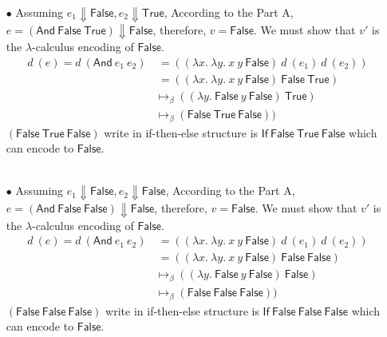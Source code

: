 \documentclass[a4paper,answers]{exam}
\begin{document}
\begin{itemize}
\begin{solution}
\begin{itemize}[leftmargin=*]
\begin{itemize}[leftmargin=*]
            
                \item[$\bullet$] Assuming $e_1 \Downarrow \mathsf{False}, e_2 \Downarrow \mathsf{True}$, According to the Part A, $e = (\mathsf{And\ False\ True}) \Downarrow \mathsf{False}$, therefore, $v = \mathsf{False}$.  We must show that $v'$ is the $\lambda$-calculus encoding of $\mathsf{False}$.
                \begin{align*}
                    d\ (e) = d\ (\mathsf{And}\ e_1\ e_2) &\ = ((\lambda x.\ \lambda y.\ x\ y\ \mathsf{False})\ d\ (e_1)\ d\ (e_2))\\
                    &\ = ((\lambda x.\ \lambda y.\ x\ y\ \mathsf{False})\ \mathsf{False\ True})\\
                    & \mapsto_{\beta} ((\lambda y.\ \mathsf{False}\ y\ \mathsf{False})\ \mathsf{True})\\
                    & \mapsto_{\beta} (\mathsf{False\ True\ False}))
                \end{align*}
                $(\mathsf{False\ True\ False})$ write in if-then-else structure is $\mathsf{If\ False\ True\ False}$ which can encode to $\mathsf{False}$.\\\\
                
                
                \item[$\bullet$] Assuming $e_1 \Downarrow \mathsf{False}, e_2 \Downarrow \mathsf{False}$, According to the Part A, $e = (\mathsf{And\ False\ False}) \Downarrow \mathsf{False}$, therefore, $v = \mathsf{False}$.  We must show that $v'$ is the $\lambda$-calculus encoding of $\mathsf{False}$.
                \begin{align*}
                    d\ (e) = d\ (\mathsf{And}\ e_1\ e_2) &\ = ((\lambda x.\ \lambda y.\ x\ y\ \mathsf{False})\ d\ (e_1)\ d\ (e_2))\\
                    &\ = ((\lambda x.\ \lambda y.\ x\ y\ \mathsf{False})\ \mathsf{False\ False})\\
                    & \mapsto_{\beta} ((\lambda y.\ \mathsf{False}\ y\ \mathsf{False})\ \mathsf{False})\\
                    & \mapsto_{\beta} (\mathsf{False\ False\ False}))
                \end{align*}
                $(\mathsf{False\ False\ False})$ write in if-then-else structure is $\mathsf{If\ False\ False\ False}$ which can encode to $\mathsf{False}$.\\
            \end{itemize}    
        \end{itemize}
    \end{solution}


\end{itemize}
\end{document}
